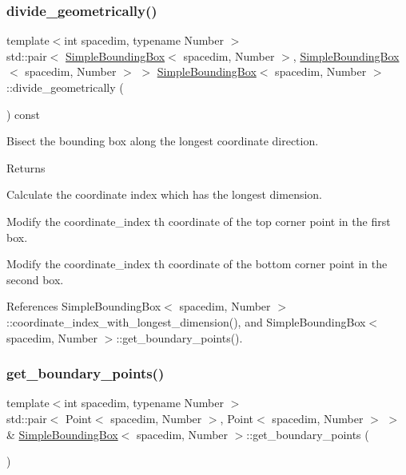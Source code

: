 \mbox{\label{classSimpleBoundingBox_a0b8bef0a9504e22a7e2c4cc3d4ed04c4}} 
\subsubsection{\texorpdfstring{divide\+\_\+geometrically()}{divide\_geometrically()}}
{\footnotesize\ttfamily template$<$int spacedim, typename Number $>$ \\
std\+::pair$<$ \hyperlink{classSimpleBoundingBox}{Simple\+Bounding\+Box}$<$ spacedim, Number $>$, \hyperlink{classSimpleBoundingBox}{Simple\+Bounding\+Box}$<$ spacedim, Number $>$ $>$ \hyperlink{classSimpleBoundingBox}{Simple\+Bounding\+Box}$<$ spacedim, Number $>$\+::divide\+\_\+geometrically (\begin{DoxyParamCaption}{ }\end{DoxyParamCaption}) const}

Bisect the bounding box along the longest coordinate direction. \begin{DoxyReturn}{Returns}

\end{DoxyReturn}
Calculate the coordinate index which has the longest dimension.

Modify the {\ttfamily coordinate\+\_\+index} \textquotesingle{}th coordinate of the top corner point in the first box.

Modify the {\ttfamily coordinate\+\_\+index} \textquotesingle{}th coordinate of the bottom corner point in the second box.

References Simple\+Bounding\+Box$<$ spacedim, Number $>$\+::coordinate\+\_\+index\+\_\+with\+\_\+longest\+\_\+dimension(), and Simple\+Bounding\+Box$<$ spacedim, Number $>$\+::get\+\_\+boundary\+\_\+points().

\mbox{\label{classSimpleBoundingBox_a1cccc2f8ebc6b5f406738f04e145b598}} 
\subsubsection{\texorpdfstring{get\+\_\+boundary\+\_\+points()}{get\_boundary\_points()}\hspace{0.1cm}{\footnotesize\ttfamily [1/2]}}
{\footnotesize\ttfamily template$<$int spacedim, typename Number $>$ \\
std\+::pair$<$ Point$<$ spacedim, Number $>$, Point$<$ spacedim, Number $>$ $>$ \& \hyperlink{classSimpleBoundingBox}{Simple\+Bounding\+Box}$<$ spacedim, Number $>$\+::get\+\_\+boundary\+\_\+points (\begin{DoxyParamCaption}{ }\end{DoxyParamCaption})}

